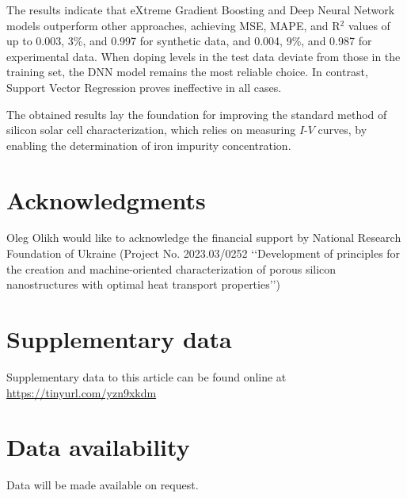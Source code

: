 \documentclass[a4paper,fleqn,draft]{cas-sc}
\begin{document}
The results indicate that eXtreme Gradient Boosting and Deep Neural Network models outperform other approaches,
achieving MSE, MAPE, and R$^2$ values of up to 0.003, 3\%, and 0.997 for synthetic data,
and 0.004, 9\%, and 0.987 for experimental data.
When doping levels in the test data deviate from those in the training set,
the DNN model remains the most reliable choice.
In contrast, Support Vector Regression proves ineffective in all cases.

The obtained results lay the foundation for improving the standard method of silicon solar cell characterization,
which relies on measuring $I$-$V$ curves,
by enabling the determination of iron impurity concentration.




\section*{Acknowledgments}
Oleg Olikh would like to acknowledge the financial support by
National Research Foundation of Ukraine (Project No. 2023.03/0252
‘‘Development of principles for the creation and machine-oriented
characterization of porous silicon nanostructures with optimal
heat transport properties’’)

\section*{Supplementary data}\label{SuplData}
Supplementary data to this article can be found online at
\url{https://tinyurl.com/yzn9xkdm}


\section*{Data availability}
Data will be made available on request.





%


\end{document}
